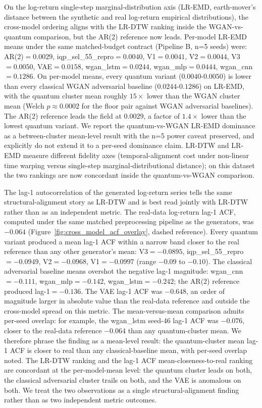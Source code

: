 \documentclass[12pt,twocolumn]{article}
\begin{document}
On the log-return single-step marginal-distribution axis (LR-EMD,
earth-mover's distance between the synthetic and real log-return
empirical distributions), the cross-model ordering aligns with the
LR-DTW ranking inside the WGAN-vs-quantum comparison, but the AR(2)
reference now leads. Per-model LR-EMD means under the same
matched-budget contract (Pipeline B, n=5 seeds) were:
AR(2)$=0.0029$, iqp\_sel\_55\_repro$=0.0040$, V1$=0.0041$,
V2$=0.0044$, V3$=0.0050$, VAE$=0.0158$, wgan\_lstm$=0.0244$,
wgan\_mlp$=0.0444$, wgan\_cnn$=0.1286$. On per-model means, every
quantum variant ($0.0040$-$0.0050$) is lower than every classical
WGAN adversarial baseline ($0.0244$-$0.1286$) on LR-EMD, with the
quantum cluster mean roughly $15\times$ lower than the WGAN cluster
mean (Welch $p \approx 0.0002$ for the floor pair against WGAN
adversarial baselines). The AR(2) reference leads the field at
$0.0029$, a factor of $1.4\times$ lower than the lowest quantum
variant. We report the quantum-vs-WGAN LR-EMD dominance as a
between-cluster mean-level result with the n=5 power caveat preserved,
and explicitly do not extend it to a per-seed dominance claim. LR-DTW
and LR-EMD measure different fidelity axes (temporal-alignment cost
under non-linear time warping versus single-step
marginal-distributional distance); on this dataset the two rankings
are now concordant inside the quantum-vs-WGAN comparison.

The lag-1 autocorrelation of the generated log-return series tells the
same structural-alignment story as LR-DTW and is best read jointly with
LR-DTW rather than as an independent metric. The real-data log-return
lag-1 ACF, computed under the same matched preprocessing pipeline as
the generators, was $-0.064$
(Figure~\ref{fig:cross_model_acf_overlay}, dashed reference). Every
quantum variant produced a mean lag-1 ACF within a narrow band closer
to the real reference than any other generator's mean:
V3$=-0.0895$, iqp\_sel\_55\_repro$=-0.0949$, V2$=-0.0968$,
V1$=-0.0997$ (range $-0.09$ to $-0.10$). The classical adversarial
baseline means overshot the negative lag-1 magnitude:
wgan\_cnn$=-0.111$, wgan\_mlp$=-0.142$, wgan\_lstm$=-0.242$; the AR(2)
reference produced lag-1$=-0.136$. The VAE lag-1 ACF was $-0.648$, an
order of magnitude larger in absolute value than the real-data
reference and outside the cross-model spread on this metric. The
mean-versus-mean comparison admits per-seed overlap: for example, the
wgan\_lstm seed-46 lag-1 ACF was $-0.076$, closer to the real-data
reference $-0.064$ than any quantum-cluster mean. We therefore phrase
the finding as a mean-level result: the quantum-cluster mean lag-1 ACF
is closer to real than any classical-baseline mean, with per-seed
overlap noted. The LR-DTW ranking and the lag-1 ACF
mean-closeness-to-real ranking are concordant at the per-model-mean
level: the quantum cluster leads on both, the classical adversarial
cluster trails on both, and the VAE is anomalous on both. We treat
the two observations as a single structural-alignment finding rather
than as two independent metric outcomes.
\end{document}
